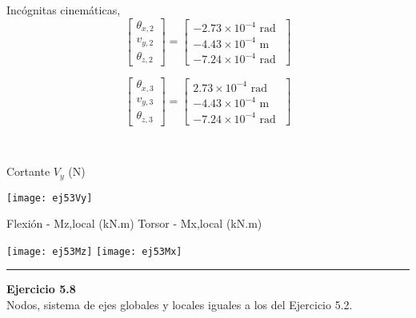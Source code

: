 \begin{minipage}{0.45\textwidth}
	Incógnitas cinemáticas,
	$$
	\left[
	\begin{matrix}
	\theta_{x,2} \\
	v_{y,2} \\
	\theta_{z,2}
	\end{matrix}
	\right]
	=
	\left[
	\begin{matrix}
	-2.73\times 10^{-4} \text{ rad }\\
	-4.43\times 10^{-4} \text{ m }\\
	-7.24\times 10^{-4} \text{ rad }
	\end{matrix}
	\right]
	$$
	
	$$
	\left[
	\begin{matrix}
	\theta_{x,3} \\
	v_{y,3} \\
	\theta_{z,3}
	\end{matrix}
	\right]
	=
	\left[
	\begin{matrix}
	2.73\times 10^{-4} \text{ rad }\\
	-4.43\times 10^{-4} \text{ m }\\
	-7.24\times 10^{-4} \text{ rad }
	\end{matrix}
	\right]
	$$
\end{minipage}
~
\begin{minipage}{0.45\textwidth}
	Cortante $V_y$ (N)
	
	\texttt{[image: ej53Vy]}
\end{minipage}


Flexión - Mz,local (kN.m) \hfill  Torsor - Mx,local (kN.m)

\texttt{[image: ej53Mz]}
\texttt{[image: ej53Mx]}




\hrule 
\vspace{5mm}
\textbf{Ejercicio 5.8}\\

Nodos, sistema de ejes globales y locales iguales a los del Ejercicio 5.2.



